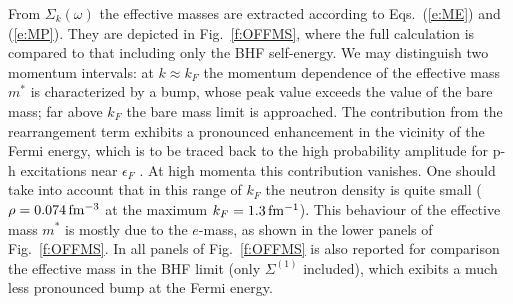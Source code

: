 \documentclass[runningheads]{svmult}
\def\sig{\Sigma}
\begin{document}
From $\sig_k(\omega)$ the effective masses  
are extracted according to Eqs.~(\ref{e:ME}) and (\ref{e:MP}). 
They are depicted in Fig.~\ref{f:OFFMS}, where the full calculation is 
compared to that including only the BHF self-energy.
We may distinguish two momentum intervals: 
at $k\approx k_F$ the momentum dependence of the effective mass $m^*$ is 
characterized by a bump, whose peak value exceeds the value of the bare mass; 
far above $k_F$ the bare mass limit is approached. 
The contribution from the rearrangement term exhibits a
pronounced enhancement in the vicinity of the Fermi energy, which is to be
traced back to the high probability amplitude for p-h excitations 
near $\epsilon_F$ \cite{ZUO}. 
At high momenta this contribution vanishes. 
One should take into account that in this range of $k_F$ the neutron
density is quite small 
($\rho=0.074\,\rm fm^{-3}$ at the maximum $k_F=1.3\,\rm fm^{-1}$). 
This behaviour of the effective mass $m^*$ is mostly due to the $e$-mass, 
as shown in the lower panels of Fig.~\ref{f:OFFMS}. 
In all panels of Fig.~\ref{f:OFFMS} is also reported 
for comparison the effective mass in the BHF limit 
(only $\Sigma^{(1)}$ included), 
which exibits a much less pronounced bump at the Fermi energy.
\end{document}
